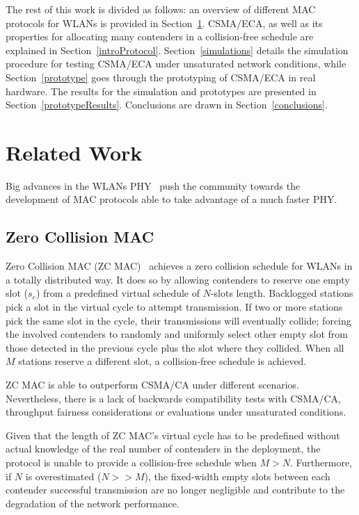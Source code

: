 \documentclass[a4paper,journal]{IEEEtran}
\begin{document}
The rest of this work is divided as follows: an overview of different MAC protocols for WLANs is provided in  Section~\ref{relatedWork}. CSMA/ECA, as well as its properties for allocating many contenders in a collision-free schedule are explained in Section~\ref{introProtocol}. Section~\ref{simulations} details the simulation procedure for testing CSMA/ECA under unsaturated network conditions, while Section~\ref{prototype} goes through the prototyping of CSMA/ECA in real hardware. The results for the simulation and prototypes are presented in Section~\ref{prototypeResults}. Conclusions are drawn in Section~\ref{conclusions}.



\section{Related Work}\label{relatedWork}
Big advances in the WLANs PHY~\cite{perahia2008ieee,6191306} push the community towards the development of MAC protocols able to take advantage of a much faster PHY.

\subsection{Zero Collision MAC} 

Zero Collision MAC (ZC MAC)~\cite{ZMAC} achieves a zero collision schedule for WLANs in a totally distributed way. It does so by allowing contenders to reserve one empty slot ($s_{e}$) from a  predefined virtual schedule of $N$-slots length. Backlogged stations pick a slot in the virtual cycle to attempt transmission. If two or more stations pick the same slot in the cycle, their transmissions will eventually collide; forcing the involved contenders to randomly and uniformly select other empty slot from those detected in the previous cycle plus the slot where they collided. When all $M$ stations reserve a different slot, a collision-free schedule is achieved.

ZC MAC is able to outperform CSMA/CA under different scenarios. Nevertheless, there is a lack of backwards compatibility tests with CSMA/CA, throughput fairness considerations or evaluations under unsaturated conditions. 

Given that the length of ZC MAC's virtual cycle has to be predefined without actual knowledge of the real number of contenders in the deployment, the protocol is unable to provide a collision-free schedule when $M>N$. Furthermore, if $N$ is overestimated ($N>>M$), the fixed-width empty slots between each contender successful transmission are no longer negligible and contribute to the degradation of the network performance.
\end{document}
